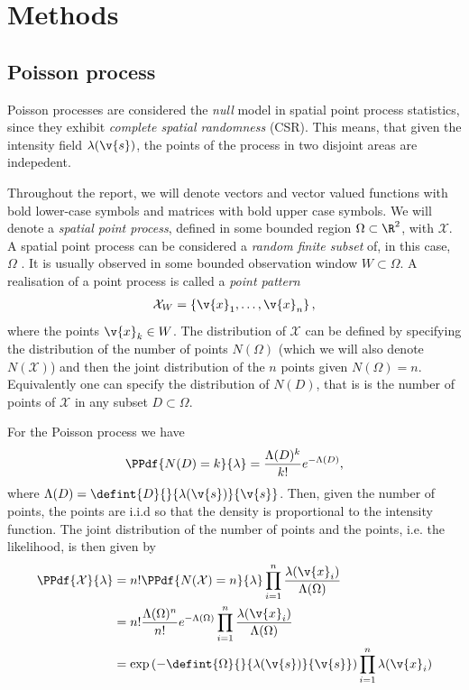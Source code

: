 \documentclass[12pt,a4paper,oneside,article]{memoir}
\begin{document}
\section{Methods}


\subsection{Poisson process}

Poisson processes are considered the \emph{null} model in spatial 
point process statistics, since they exhibit \emph{complete spatial randomness} (CSR).
This means, that given the intensity field $\lambda(\v{s})$, the points of the process 
in two disjoint areas are indepedent.

Throughout the report, we will denote  vectors and vector valued functions with bold lower-case symbols and matrices
with bold upper case symbols. We will denote a \emph{spatial point process}, defined in some bounded region
$\Omega\subset\R^2$, with $\mathcal{X}$. A spatial point process can be considered a 
\emph{random finite subset} of, in this case, $\Omega$ \cite{Moller2007}. It is usually observed
in some bounded observation window $W\subset\Omega$.
A realisation of a point process is called a \emph{point pattern}
\begin{align}
	\mathcal{X}_W=\left\{\v{x}_1,\dots,\v{x}_n\right\},
	\label{eq:point_pattern}
\end{align}
where the points $\v{x}_k\in W$. 
The distribution of $\mathcal{X}$ can be defined by specifying the distribution of
the number of points $N(\Omega)$ (which we will also denote $N(\mathcal{X})$) and then the joint distribution of the $n$
points given $N(\Omega)=n$. Equivalently one can specify the distribution of $N(D)$, that is
is the number of points of $\mathcal{X}$ in any subset $D\subset \Omega$.

For the Poisson process we have
\begin{align}
	\PPdf{N(D)=k}{\lambda}=\frac{\Lambda(D)^k}{k!}e^{-\Lambda(D)},
	\label{eq:poisson}
\end{align}
where $\Lambda(D)=\defint{D}{}{\lambda(\v{s})}{\v{s}}$. Then, given the number of points,
the points are i.i.d so that the density is proportional to the intensity function. The joint distribution
of the number of points and the points, i.e. the likelihood, is then given by
\begin{align}
	\PPdf{\mathcal{X}}{\lambda}&=n!\PPdf{N(\mathcal{X})=n}{\lambda}\prod_{i=1}^n\frac{\lambda(\v{x}_i)}{\Lambda(\Omega)}
	\nonumber\\
	&=n!\frac{\Lambda(\Omega)^n}{n!}e^{-\Lambda(\Omega)}\prod_{i=1}^n\frac{\lambda(\v{x}_i)}{\Lambda(\Omega)} \nonumber\\
	&= \exp\left( -\defint{\Omega}{}{\lambda(\v{s})}{\v{s}} \right)\prod_{i=1}^n \lambda(\v{x}_i)
	\label{eq:poisson_lh}
\end{align}
\end{document}
